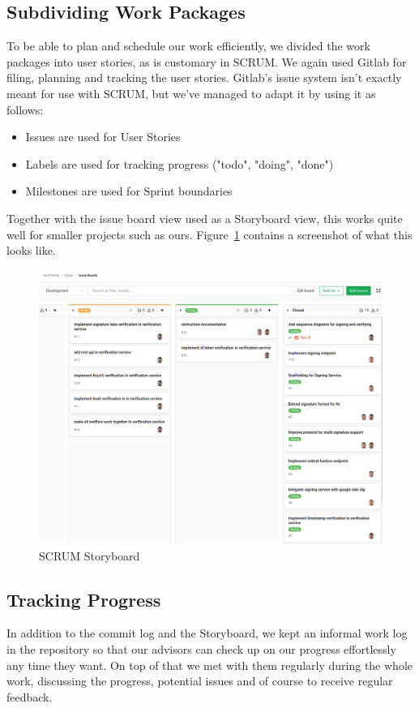 \subsection{Subdividing Work Packages}\label{subsec:subdividing-work-packages}
To be able to plan and schedule our work efficiently,
we divided the work packages into user stories,
as is customary in SCRUM.
We again used Gitlab for filing, planning and tracking the user stories.
Gitlab's issue system isn't exactly meant for use with SCRUM,
but we've managed to adapt it by using it as follows:
\begin{itemize}
    \item Issues are used for User Stories
    \item Labels are used for tracking progress ("todo", "doing", "done")
    \item Milestones are used for Sprint boundaries
\end{itemize}
Together with the issue board view used as a Storyboard view,
this works quite well for smaller projects such as ours.
Figure~\ref{fig:scrumboard} contains a screenshot of what this looks like.

\begin{figure}
    \begin{center}
        \includegraphics[width=0.8\linewidth]{images/board.png}
        \caption{SCRUM Storyboard}
        \label{fig:scrumboard}
    \end{center}
\end{figure}

\subsection{Tracking Progress}\label{subsec:tracking-progress}
In addition to the commit log and the Storyboard,
we kept an informal work log in the repository so that our advisors can check up on our progress effortlessly
any time they want.
On top of that we met with them regularly during the whole work,
discussing the progress, potential issues and of course to receive regular feedback.


